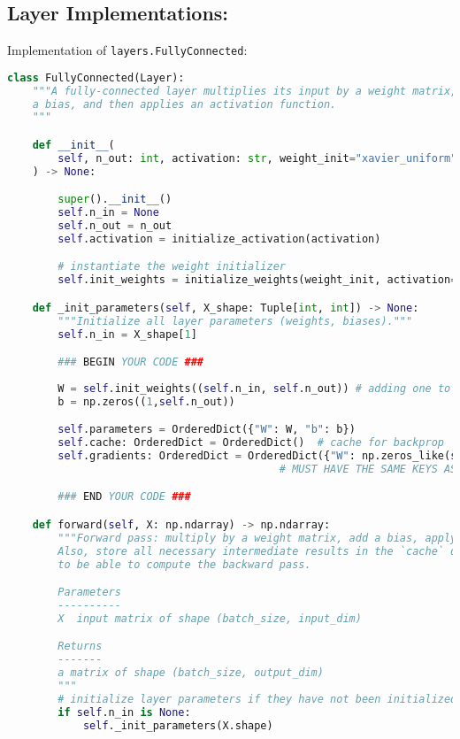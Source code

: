 \subsection{Layer Implementations:}

Implementation of \texttt{layers.FullyConnected}:

\begin{lstlisting}[language=Python]
class FullyConnected(Layer):
    """A fully-connected layer multiplies its input by a weight matrix, adds
    a bias, and then applies an activation function.
    """

    def __init__(
        self, n_out: int, activation: str, weight_init="xavier_uniform"
    ) -> None:

        super().__init__()
        self.n_in = None
        self.n_out = n_out
        self.activation = initialize_activation(activation)

        # instantiate the weight initializer
        self.init_weights = initialize_weights(weight_init, activation=activation)

    def _init_parameters(self, X_shape: Tuple[int, int]) -> None:
        """Initialize all layer parameters (weights, biases)."""
        self.n_in = X_shape[1]

        ### BEGIN YOUR CODE ###
        
        W = self.init_weights((self.n_in, self.n_out)) # adding one to the input dimension for the bias term
        b = np.zeros((1,self.n_out))

        self.parameters = OrderedDict({"W": W, "b": b})
        self.cache: OrderedDict = OrderedDict()  # cache for backprop
        self.gradients: OrderedDict = OrderedDict({"W": np.zeros_like(self.parameters["W"]), "b": np.zeros_like(self.parameters["b"])})# parameter gradients initialized to zero
                                           # MUST HAVE THE SAME KEYS AS `self.parameters`

        ### END YOUR CODE ###

    def forward(self, X: np.ndarray) -> np.ndarray:
        """Forward pass: multiply by a weight matrix, add a bias, apply activation.
        Also, store all necessary intermediate results in the `cache` dictionary
        to be able to compute the backward pass.

        Parameters
        ----------
        X  input matrix of shape (batch_size, input_dim)

        Returns
        -------
        a matrix of shape (batch_size, output_dim)
        """
        # initialize layer parameters if they have not been initialized
        if self.n_in is None:
            self._init_parameters(X.shape)


\end{lstlisting}
